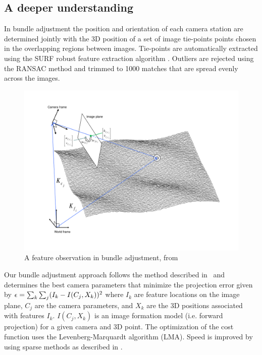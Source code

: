\subsection{A deeper understanding}

In bundle adjustment the position and orientation of each camera
station are determined jointly with the 3D position of a set of
image tie-points points chosen in the overlapping regions between
images.  Tie-points are automatically extracted using the SURF
robust feature extraction algorithm \citep{surf08}.  Outliers are
rejected using the RANSAC method \citep{fischler81} and trimmed to
1000 matches that are spread evenly across the images.

\begin{figure}[b!]
  \begin{center}
  \includegraphics[trim=20mm 20mm 20mm 15mm,clip,width=6in]{images/ba_feature_observation.pdf}
  \end{center}
  \caption{ A feature observation in bundle adjustment, from \citet{moore09} }
  \label{fig:ba_feature}
\end{figure}

Our bundle adjustment approach follows the method described
in~\cite{triggs00} and determines the best camera
parameters that minimize the projection error given by ${\bf \epsilon}
= \sum_k\sum_j(I_k-I(C_j, X_k))^2$ where $I_k$ are feature locations
on the image plane, $C_j$ are the camera parameters, and $X_k$ are the
3D positions associated with features $I_k$. $I(C_j, X_k)$ is an image
formation model (i.e. forward projection) for a given camera and 3D
point.  The optimization of the cost function uses the
Levenberg-Marquardt algorithm (LMA). Speed is improved by using sparse
methods as described in \citet{hartley04}.

